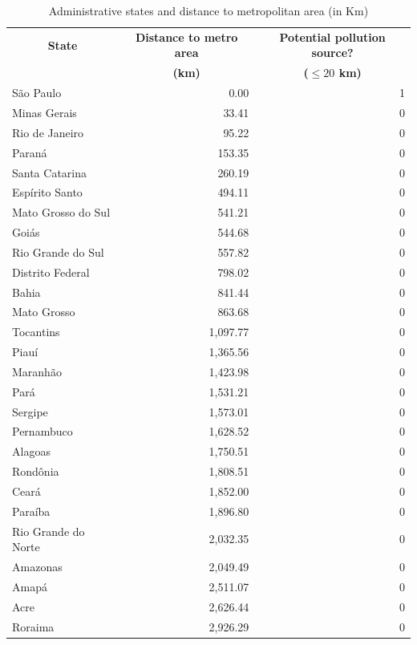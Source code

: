 \begin{table}[htbp]
  \centering
  \caption{Administrative states and distance to metropolitan area (in Km)}
  \begin{tabular}{lrr}
    \midrule
    \midrule
    \multicolumn{1}{c}{\textbf{State}} &
    \multicolumn{1}{c}{\textbf{Distance to metro area}} &
    \multicolumn{1}{c}{\textbf{Potential pollution source?}} \\
    \multicolumn{1}{c}{} &
    \multicolumn{1}{c}{\textbf{(km)}} &
    \multicolumn{1}{c}{\textbf{($\leq 20$ km)}} \\
    \midrule
    São Paulo & 0.00 & 1 \\
    Minas Gerais & 33.41 & 0 \\
    Rio de Janeiro & 95.22 & 0 \\
    Paraná & 153.35 & 0 \\
    Santa Catarina & 260.19 & 0 \\
    Espírito Santo & 494.11 & 0 \\
    Mato Grosso do Sul & 541.21 & 0 \\
    Goiás & 544.68 & 0 \\
    Rio Grande do Sul & 557.82 & 0 \\
    Distrito Federal & 798.02 & 0 \\
    Bahia & 841.44 & 0 \\
    Mato Grosso & 863.68 & 0 \\
    Tocantins & 1,097.77 & 0 \\
    Piauí & 1,365.56 & 0 \\
    Maranhão & 1,423.98 & 0 \\
    Pará & 1,531.21 & 0 \\
    Sergipe & 1,573.01 & 0 \\
    Pernambuco & 1,628.52 & 0 \\
    Alagoas & 1,750.51 & 0 \\
    Rondônia & 1,808.51 & 0 \\
    Ceará & 1,852.00 & 0 \\
    Paraíba & 1,896.80 & 0 \\
    Rio Grande do Norte & 2,032.35 & 0 \\
    Amazonas & 2,049.49 & 0 \\
    Amapá & 2,511.07 & 0 \\
    Acre & 2,626.44 & 0 \\
    Roraima & 2,926.29 & 0 \\
    \bottomrule
    \bottomrule
  \end{tabular}
  \label{table_state_metro_distances}
\end{table}
